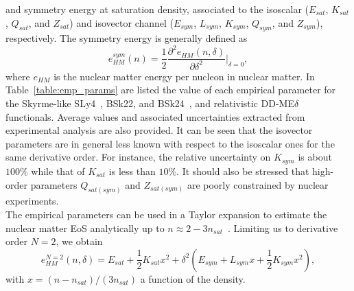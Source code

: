 and symmetry energy at saturation density, associated to the isoscalar
($E_{sat}$, $K_{sat}$, $Q_{sat}$, and $Z_{sat}$) and isovector channel ($E_{sym}$,
$L_{sym}$, $K_{sym}$, $Q_{sym}$, and $Z_{sym}$), respectively. 
The symmetry energy is generally defined as
%
\begin{equation}
  e_{HM}^{sym}(n) = \frac{1}{2}\frac{\partial^2 e_{HM}(n,\delta)}{\partial
  \delta^2}\bigg|_{\delta=0},\label{eq:esym}
\end{equation}
%
where $e_{HM}$ is the nuclear matter energy per nucleon in nuclear matter. In
Table~\ref{table:emp_params} are listed the value of each empirical parameter
for the Skyrme-like SLy4~\cite{Chabanat1998}, BSk22, and
BSk24~\cite{Goriely2013}, and relativistic
DD-ME$\delta$~\cite{RocaMaza2011} functionals. Average values and associated
uncertainties extracted from experimental analysis are also provided. It can be
seen that the isovector parameters are in general less known with respect to
the isoscalar ones for the same derivative order. For instance, the relative
uncertainty on $K_{sym}$ is about $100\%$ while that of $K_{sat}$ is less than
$10\%$. It should also be stressed that high-order parameters $Q_{sat(sym)}$
and $Z_{sat(sym)}$ are poorly constrained by nuclear experiments.\\
The empirical parameters can be used in a Taylor expansion to estimate the
nuclear matter EoS analytically up to 
$n \approx 2-3n_{sat}$~\cite{Margueron2018a,Margueron2018b}. Limiting us to 
derivative order $N=2$, we obtain
%
\begin{equation}
  e^{N=2}_{HM}(n,\delta) = E_{sat} + \frac{1}{2}K_{sat}x^2 
  + \delta^2 (E_{sym} + L_{sym}x +\frac{1}{2}K_{sym}x^2),
\end{equation}
%
with $x = (n-n_{sat})/(3n_{sat})$ a function of the density. 

